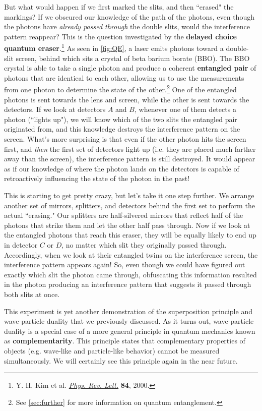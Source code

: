 But what would happen if we first marked the slits, and then ``erased" the markings? 
If we obscured our knowledge of the path of the photons, even though the photons have \emph{already passed through} the double slits, would the interference pattern reappear? 
This is the question investigated by the \textbf{delayed choice quantum eraser}.\footnote{Y. H. Kim et al. \href{https://journals.aps.org/prl/abstract/10.1103/PhysRevLett.84.1}{\emph{Phys. Rev. Lett.}} \textbf{84}, 2000.} 
As seen in \autoref{fig:QE}, a laser emits photons toward a double-slit screen, behind which sits a crystal of beta barium borate (BBO). 
The BBO crystal is able to take a single photon and produce a coherent \textbf{entangled pair} of photons that are identical to each other, allowing us to use the measurements from one photon to determine the state of the other.\footnote{See \autoref{sec:further} for more information on quantum entanglement.} 
One of the entangled photons is sent towards the lens and screen, while the other is sent towards the detectors. 
If we look at detectors $A$ and $B$, whenever one of them detects a photon (``lights up"), we will know which of the two slits the entangled pair originated from, and this knowledge destroys the interference pattern on the screen. 
What's more surprising is that even if the other photon hits the screen first, and \emph{then} the first set of detectors light up (i.e. they are placed much farther away than the screen), the interference pattern is still destroyed. 
It would appear as if our knowledge of where the photon lands on the detectors is capable of retroactively influencing the state of the photon in the past! 

This is starting to get pretty crazy, but let's take it one step further. 
We arrange another set of mirrors, splitters, and detectors behind the first set to perform the actual ``erasing." 
Our splitters are half-silvered mirrors that reflect half of the photons that strike them and let the other half pass through. 
Now if we look at the entangled photons that reach this eraser, they will be equally likely to end up in detector $C$ or $D$, no matter which slit they originally passed through. 
Accordingly, when we look at their entangled twins on the interference screen, the interference pattern appears again! 
So, even though we could have figured out exactly which slit the photon came through, obfuscating this information resulted in the photon producing an interference pattern that suggests it passed through both slits at once. 

This experiment is yet another demonstration of the superposition principle and wave-particle duality that we previously discussed. 
As it turns out, wave-particle duality is a special case of a more general principle in quantum mechanics known as \textbf{complementarity}. 
This principle states that complementary properties of objects (e.g. wave-like and particle-like behavior) cannot be measured simultaneously. 
We will certainly see this principle again in the near future.


